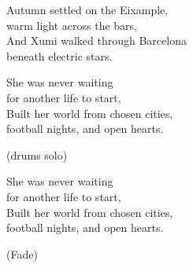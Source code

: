 \begin{lyrics}
Autumn settled on the Eixample,\\
warm light across the bars,\\
And Xumi walked through Barcelona\\
beneath electric stars.

She was never waiting\\
for another life to start,\\
Built her world from chosen cities,\\
football nights, and open hearts.

(drums solo)

She was never waiting\\
for another life to start,\\
Built her world from chosen cities,\\
football nights, and open hearts.

(Fade)

\end{lyrics}

